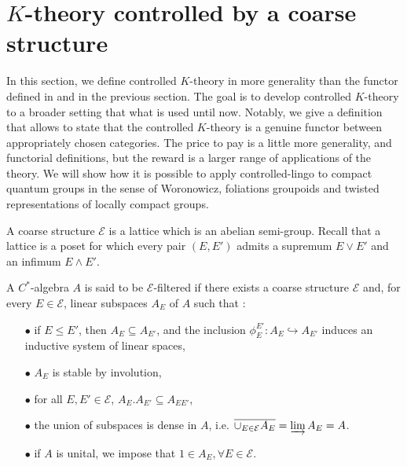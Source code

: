 \section{$K$-theory controlled by a coarse structure}

In this section, we define controlled $K$-theory in more generality than the functor defined in \cite{OY2} and in the previous section. The goal is to develop controlled $K$-theory to a broader setting that what is used until now. Notably, we give a definition that allows to state that the controlled $K$-theory is a genuine functor between appropriately chosen categories. The price to pay is a little more generality, and functorial definitions, but the reward is a larger range of applications of the theory. We will show how it is possible to apply controlled-lingo to compact quantum groups in the sense of Woronowicz, foliations groupoids and twisted representations of locally compact groups.\\

\begin{definition}
A coarse structure $\mathcal E$ is a lattice which is an abelian semi-group. %
Recall that a lattice is a poset for which every pair $(E,E')$ admits a supremum $E\vee E'$ and an infimum $E\wedge E'$.
\end{definition}

\begin{definition}
A $C^*$-algebra $A$ is said to be $\mathcal E$-filtered if there exists a coarse structure $\mathcal E$ and, for every $E\in \mathcal E$, linear subspaces $A_E$ of $A$ such that :\\
\begin{itemize}
\item[$\bullet$] if $E \leq E'$, then $A_E\subseteq A_{E'}$, and the inclusion $\phi_E^{E'}: A_E\hookrightarrow A_{E'}$ induces an inductive system of linear spaces,
\item[$\bullet$] $A_E$ is stable by involution,
\item[$\bullet$] for all $E,E'\in\mathcal E$, $A_E.A_{E'}\subseteq A_{EE'}$,
\item[$\bullet$] the union of subspaces is dense in $A$, i.e. $\overline{\cup_{E\in\mathcal E}A_E} = \varinjlim A_E = A$.
\item[$\bullet$] if $A$ is unital, we impose that $1\in A_E,\forall E\in\mathcal E$.
\end{itemize}
\end{definition}

